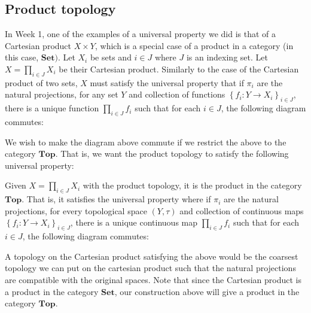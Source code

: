 \documentclass[12pt,reqno]{amsart}
\numberwithin{theorem}{section}
\theoremstyle{definition}
\theoremstyle{remark}
\numberwithin{equation}{section}
\newcommand{\set}[1]{\left \{ #1 \right \}}
\theoremstyle{definition}
\begin{document}
\subsection{Product topology}
In Week 1, one of the examples of a universal property we did is that of a Cartesian product $X\times Y$, which is a special case of a product in a category (in this case, $\mathbf{Set})$. Let $X_i$ be sets and $i\in J$ where $J$ is an indexing set. Let $X=\prod_{i \in J}X_i$ be their Cartesian product. Similarly to the case of the Cartesian product of two sets, $X$ must satisfy the universal property that if $\pi_i$ are the natural projections, for any set $Y$ and collection of functions $\set{f_i:Y\rightarrow X_i}_{i \in J}$, there is a unique function $\prod_{i \in J} f_i$ such that for each $i \in J$, the following diagram commutes: 
    \begin{center}
    \end{center}
We wish to make the diagram above commute if we restrict the above to the category $\mathbf{Top}$. That is, we want the product topology to satisfy the following universal property:
\begin{proposition}
    Given $X=\prod_{i \in J} X_i$ with the product topology, it is the product in the category $\mathbf{Top}$. That is, it satisfies the universal property where if $\pi_i$ are the natural projections, for every topological space $(Y,\tau)$ and collection of continuous maps $\set{f_i:Y\rightarrow X_i}_{i \in J}$, there is a unique continuous map $\prod_{i \in J} f_i$ such that for each $i \in J$, the following diagram commutes: 
    \begin{center}
    \end{center}
\end{proposition}
A topology on the Cartesian product satisfying the above would be the coarsest topology we can put on the cartesian product such that the natural projections are compatible with the original spaces. Note that since the Cartesian product is a product in the category $\mathbf{Set}$, our construction above will give a product in the category $\mathbf{Top}$.
\end{document}
